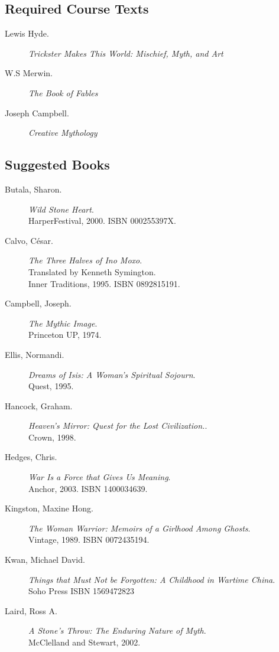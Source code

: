 \documentclass[10pt,DIV09,letterpaper,oneside,headsepline]{scrreprt}
\begin{document}
\subsection{Required Course Texts}
\begin{flushleft}
\begin{description}
\item [Lewis Hyde.] \textit{Trickster Makes This World: Mischief, Myth, and Art}
\item [W.S Merwin.] \textit{The Book of Fables}
\item [Joseph Campbell.] \textit{Creative Mythology}
\end{description}

\subsection{Suggested Books}
\begin{description}
\item [Butala, Sharon.] \textit{Wild Stone Heart}. \\HarperFestival,
2000. \textsc{ISBN 000255397X}.
\item [Calvo, C\'esar.] \textit{The Three Halves of Ino Moxo}.
\\Translated by Kenneth Symington. \\Inner Traditions, 1995.
\textsc{ISBN 0892815191}.
\item [Campbell, Joseph.] \textit{The Mythic Image}.
\\Princeton UP, 1974.
\item [Ellis, Normandi.] \textit{Dreams of Isis: A Woman's Spiritual
Sojourn}.
\\Quest, 1995.
\item [Hancock, Graham.] \textit{Heaven's Mirror: Quest for the Lost
Civilization.}.
\\Crown, 1998.
\item [Hedges, Chris.] \textit{War Is a Force that Gives Us Meaning}.
\\Anchor, 2003. \textsc{ISBN 1400034639}.
\item [Kingston, Maxine Hong.] \textit{The Woman Warrior: Memoirs of a
Girlhood Among Ghosts}. \\Vintage, 1989. \textsc{ISBN
0072435194}.
\item [Kwan, Michael David.] \textit{Things that Must Not be
Forgotten: A Childhood in Wartime China}. \\Soho Press
\textsc{ISBN 1569472823}
\item [Laird, Ross A.] \textit{A Stone's Throw: The Enduring Nature of Myth}. \\McClelland and Stewart, 2002.

\end{description}
\end{flushleft}
\end{document}
